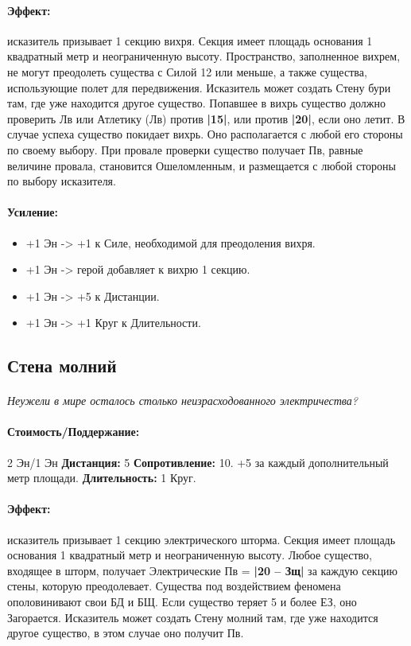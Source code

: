 \begin{itemize}
\begin{itemize}
\paragraph{Эффект: }исказитель призывает 1 секцию вихря. Секция имеет площадь основания 1 квадратный метр и неограниченную высоту. Пространство, заполненное вихрем, не могут преодолеть существа с Силой 12 или меньше, а также существа, использующие полет для передвижения. 
\newline Исказитель может создать Стену бури там, где уже находится другое существо. Попавшее в вихрь существо должно проверить Лв или Атлетику (Лв) против 
\textbf{|15|}, или против 
\textbf{|20|}, если оно летит. В случае успеха существо покидает вихрь. Оно располагается с любой его стороны по своему выбору. При провале проверки существо получает Пв, равные величине провала, становится Ошеломленным, и размещается с любой стороны по выбору исказителя.
\paragraph{Усиление:}
\begin{itemize}
\item+1 Эн -> +1 к Силе, необходимой для преодоления вихря.
\item+1 Эн -> герой добавляет к вихрю 1 секцию.
\item+1 Эн -> +5 к Дистанции.
\item+1 Эн -> +1 Круг к Длительности.
\end{itemize}
\subsection{Стена молний}
\paragraph{} 
\textit{
\tbd Неужели в мире осталось столько неизрасходованного электричества?}
\paragraph{Стоимость/Поддержание: }2 Эн/1 Эн
\newline
\textbf{Дистанция: }5
\newline
\textbf{Сопротивление: }10. +5 за каждый дополнительный метр площади.
\newline 
\textbf{Длительность: }1 Круг.
\paragraph{Эффект: }исказитель призывает 1 секцию электрического шторма. Секция имеет площадь основания 1 квадратный метр и неограниченную высоту. Любое существо, входящее в шторм, получает Электрические Пв = 
\textbf{|20 – Зщ|} за каждую секцию стены, которую преодолевает. Существа под воздействием феномена ополовинивают свои БД и БЩ. Если существо теряет 5 и более ЕЗ, оно Загорается. 
\newline Исказитель может создать Стену молний там, где уже находится другое существо, в этом случае оно получит Пв.

\end{itemize}
\end{itemize}
